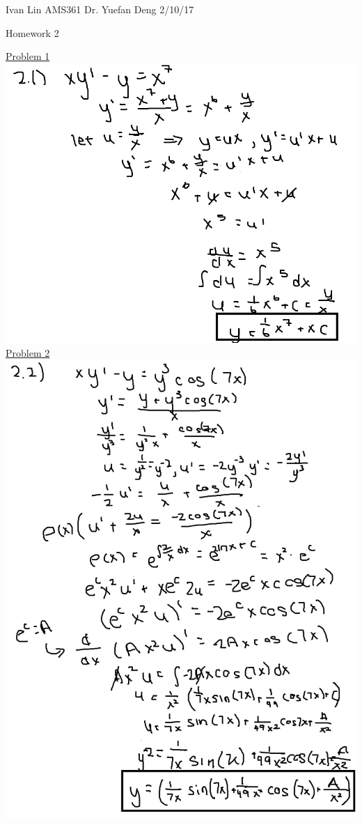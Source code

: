 \documentclass{article}
\begin{document}
Ivan Lin\newline{}
AMS361\newline{}
Dr. Yuefan Deng\newline{}
2/10/17\newline{}

\begin{center}
  Homework 2
\end{center}

\underline{Problem 1}\newline{}
\includegraphics[width=\textwidth,height=\textheight,keepaspectratio]{ams361q21.png}\clearpage{}
\underline{Problem 2}\newline{}
\includegraphics[width=\textwidth,height=\textheight,keepaspectratio]{ams361q22.png}\clearpage{}
\end{document}
